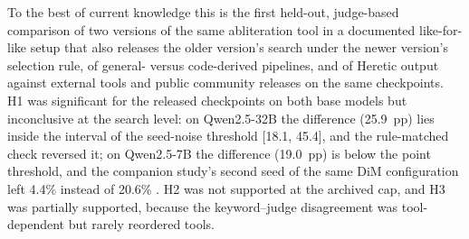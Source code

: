 To the best of current knowledge this is the first held-out, judge-based comparison of two versions of the same
abliteration tool in a documented like-for-like setup that also releases the older version's search under the newer
version's selection rule, of general- versus code-derived pipelines, and of Heretic output against external
tools and public community releases on the same checkpoints. H1 was significant for the released checkpoints on both
base models but inconclusive at the search level: on Qwen2.5-32B the difference (25.9~pp) lies inside the interval
of the seed-noise threshold [18.1, 45.4], and the rule-matched check reversed it; on Qwen2.5-7B the difference
(19.0~pp) is below the point threshold, and the companion study's second seed of the same DiM configuration left 4.4\%
instead of 20.6\% \cite{young2026harder}. H2 was not supported at the archived cap, and H3 was partially supported,
because the keyword--judge disagreement was tool-dependent but rarely reordered tools.

